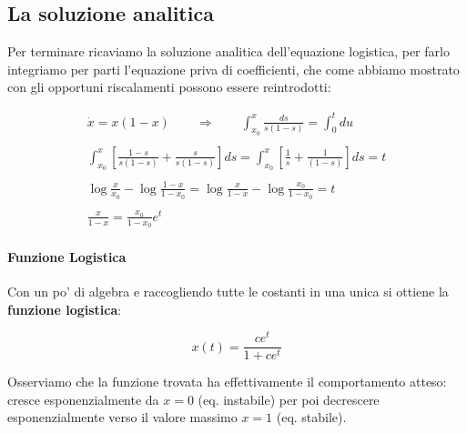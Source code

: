 \subsection{La soluzione analitica}
Per terminare ricaviamo la soluzione analitica dell'equazione logistica, per farlo integriamo per parti l'equazione priva di coefficienti, che come abbiamo mostrato con gli opportuni riscalamenti possono essere reintrodotti:
\begin{center}
	
\begin{equation*}
	\begin{gathered}
		\dot{x}=x(1-x)\qquad \Rightarrow \qquad \int_{x_0}^x \frac{ds}{s(1-s)}=\int_0^tdu\\\\
		\int_{x_0}^x \left[ \frac{1-s}{s(1-s)}+\frac{s}{s(1-s)} \right]ds=\int_{x_0}^x \left[ \frac{1}{s}+\frac{1}{(1-s)} \right]ds=t\\\\
		\log\frac{x}{x_0}-\log\frac{1-x}{1-x_0}=\log\frac{x}{1-x} - \log\frac{x_0}{1-x_0}=t\\\\	
		\frac{x}{1-x}=\frac{x_0}{1-x_0}e^t
	\end{gathered}
\end{equation*}

\end{center}\paragraph{Funzione Logistica}
Con un po' di algebra e raccogliendo tutte le costanti in una unica si ottiene la \textbf{funzione logistica}:

\begin{center}
	\begin{equation}
	x(t)=\frac{ce^t}{1+ce^t}
	\label{logfunction}
\end{equation}


\end{center}
Osserviamo che la funzione trovata ha effettivamente il comportamento atteso: cresce esponenzialmente da $x=0$ (eq. instabile) per poi decrescere esponenzialmente verso il valore massimo $x=1$ (eq. stabile). 